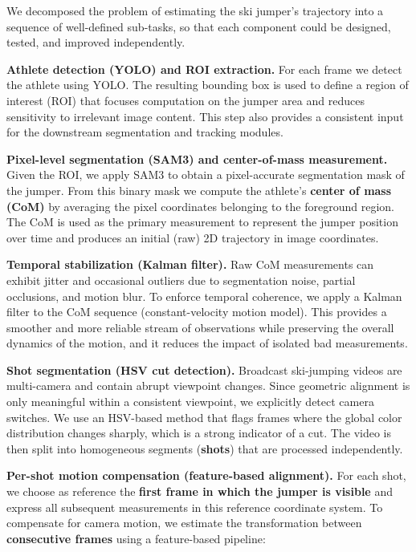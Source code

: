 We decomposed the problem of estimating the ski jumper’s trajectory into a sequence of well-defined sub-tasks, so that each component could be designed, tested, and improved independently.

\medskip

\textbf{Athlete detection (YOLO) and ROI extraction.}  
For each frame we detect the athlete using YOLO. The resulting bounding box is used to define a region of interest (ROI) that focuses computation on the jumper area and reduces sensitivity to irrelevant image content. This step also provides a consistent input for the downstream segmentation and tracking modules.

\medskip

\textbf{Pixel-level segmentation (SAM3) and center-of-mass measurement.}  
Given the ROI, we apply SAM3 to obtain a pixel-accurate segmentation mask of the jumper. From this binary mask we compute the athlete’s \textbf{center of mass (CoM)} by averaging the pixel coordinates belonging to the foreground region. The CoM is used as the primary measurement to represent the jumper position over time and produces an initial (raw) 2D trajectory in image coordinates.

\medskip

\textbf{Temporal stabilization (Kalman filter).}  
Raw CoM measurements can exhibit jitter and occasional outliers due to segmentation noise, partial occlusions, and motion blur. To enforce temporal coherence, we apply a Kalman filter to the CoM sequence (constant-velocity motion model). This provides a smoother and more reliable stream of observations while preserving the overall dynamics of the motion, and it reduces the impact of isolated bad measurements.

\medskip

\textbf{Shot segmentation (HSV cut detection).}  
Broadcast ski-jumping videos are multi-camera and contain abrupt viewpoint changes. Since geometric alignment is only meaningful within a consistent viewpoint, we explicitly detect camera switches. We use an HSV-based method that flags frames where the global color distribution changes sharply, which is a strong indicator of a cut. The video is then split into homogeneous segments (\textbf{shots}) that are processed independently.

\medskip

\textbf{Per-shot motion compensation (feature-based alignment).}  
For each shot, we choose as reference the \textbf{first frame in which the jumper is visible} and express all subsequent measurements in this reference coordinate system. To compensate for camera motion, we estimate the transformation between \textbf{consecutive frames} using a feature-based pipeline:

